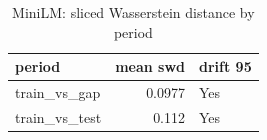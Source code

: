 \begin{table}[ht]
\centering
\caption{MiniLM: sliced Wasserstein distance by period}
\label{tab:minilm_period_swd}
\begin{tabular}{lrl}
\toprule
period & mean swd & drift 95 \\
\midrule
train\_vs\_gap & 0.0977 & Yes \\
train\_vs\_test & 0.112 & Yes \\
\bottomrule
\end{tabular}
\end{table}
